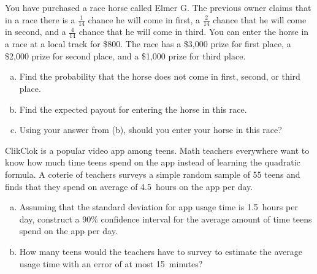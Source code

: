 \documentclass[12pt,letterpaper]{exam}
\begin{document}
\examtitle
{} 
\scores
\bottomline
\newpage

\begin{questions}

\newpage
\question[10] You have purchased a race horse called Elmer G. The previous owner claims that in a race there is a $\frac{1}{14}$ chance he will come in first, a $\frac{2}{14}$ chance that he will come in second, and a $\frac{4}{14}$ chance that he will come in third. You can enter the horse in a race at a local track for \$800. The race has a \$3,000 prize for first place, a \$2,000 prize for second place, and a \$1,000 prize for third place. 
	\begin{enumerate}[(a)]
	\item Find the probability that the horse does not come in first, second, or third place. 
	\item Find the expected payout for entering the horse in this race.
	\item Using your answer from (b), should you enter your horse in this race?
	\end{enumerate}



\newpage
\question[15] ClikClok is a popular video app among teens. Math teachers everywhere want to know how much time teens spend on the app instead of learning the quadratic formula. A coterie of teachers surveys a simple random sample of 55 teens and finds that they spend on average of 4.5~hours on the app per day. 
	\begin{enumerate}[(a)]
	\item Assuming that the standard deviation for app usage time is 1.5~hours per day, construct a 90\% confidence interval for the average amount of time teens spend on the app per day.
	\item How many teens would the teachers have to survey to estimate the average usage time with an error of at most 15~minutes? 
	\end{enumerate}




\end{questions}
\end{document}
